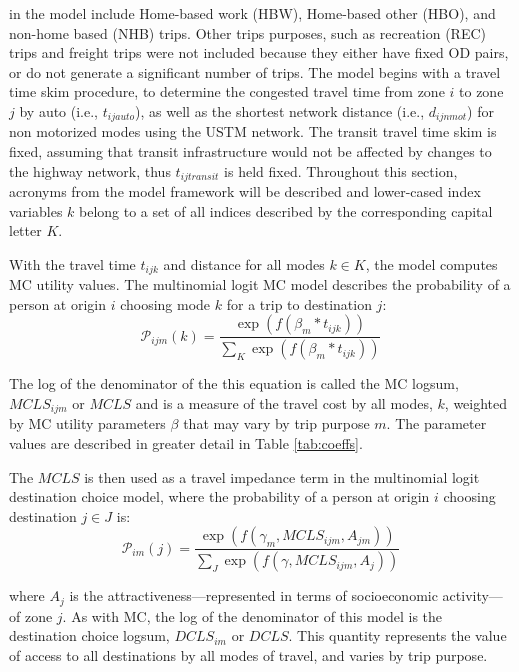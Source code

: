 in the model include Home-based work (HBW), Home-based other (HBO),
and non-home based (NHB) trips. Other trips purposes, such as recreation (REC) trips and freight trips were not included because they either have fixed OD pairs, or do not generate a significant number of trips.
The model begins with a
travel time skim procedure, to determine the congested travel time from zone
\(i\) to zone \(j\) by auto (i.e., \(t_{ijauto}\)), as well as the shortest network distance (i.e., \(d_{ijnmot}\)) for non
motorized modes using the USTM network. The transit travel time skim is fixed, assuming that transit
infrastructure would not be affected by changes to the highway network, thus \(t_{ijtransit}\) is held fixed.
Throughout this section, acronyms from the model framework will be described and lower-cased index variables \(k\) belong to a set of
all indices described by the corresponding capital letter \(K\).

With the travel time \(t_{ijk}\) and distance for all modes \(k \in K\), the
model computes MC utility values. The multinomial logit MC
model describes the probability of a person at origin \(i\) choosing mode \(k\)
for a trip to destination \(j\):
\begin{equation}
\mathcal{P}_{ijm}(k) = \frac{\exp(f(\beta_m * t_{ijk}))}
{\sum_{K}\exp(f(\beta_m * t_{ijk}))}
  \label{eq:mcp}
\end{equation}

\noindent The log of the denominator of the this equation is called the
MC logsum, \(MCLS_{ijm}\) or \(MCLS\) and is a measure of the travel cost by
all modes, $k$, weighted by MC utility parameters \(\beta\) that may vary by
trip purpose $m$. The parameter values are described in greater detail in
Table \ref{tab:coeffs}.

The \(MCLS\) is then used as a travel impedance term in the multinomial
logit
destination choice model, where the probability of a person at origin \(i\)
choosing destination \(j \in J\) is:
\begin{equation}
\mathcal{P}_{im}(j) = \frac{\exp(f(\gamma_m, MCLS_{ijm}, A_{jm}))}
{\sum_{J}\exp(f(\gamma, MCLS_{ijm}, A_j))}
  \label{eq:dcp}
\end{equation}

\noindent where \(A_j\) is the attractiveness---represented in terms of
socioeconomic activity---of zone \(j\). As with MC, the log of the
denominator of this model is the
destination choice logsum, \(DCLS_{im}\) or \(DCLS\). This quantity represents the value of access to
all destinations
by all modes of travel, and varies by trip purpose.

